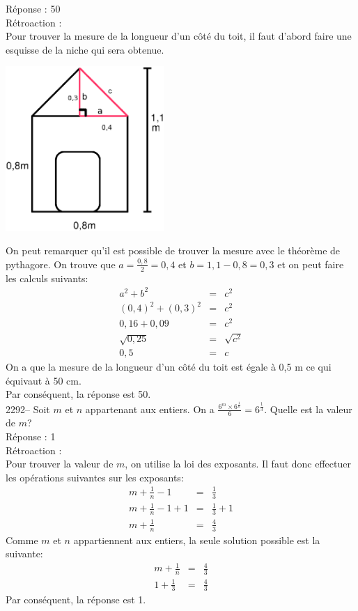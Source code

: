 \documentclass[letterpaper, 12pt]{article}
\begin{document}
R\'eponse : 50\\

R\'etroaction :\\
Pour trouver la mesure de la longueur d'un c\^ot\'e du toit, il faut d'abord faire une esquisse de la niche qui sera obtenue.\\
\begin{center}
 \includegraphics[width=6cm,bb=14 14 429 442]{Niche2291mesures.eps}
\end{center}
On peut remarquer qu'il est possible de trouver la mesure avec le th\'eor\`eme de pythagore. On trouve que $a=\frac{0,8}{2}=0,4$ et $b=1,1-0,8=0,3$ et on peut faire les calculs suivants:
\begin{eqnarray*}
a^{2}+b^{2}&=&c^{2}\\
(0,4)^{2}+(0,3)^{2}&=&c^{2}\\
0,16+0,09&=&c^{2}\\
\sqrt{0,25}&=&\sqrt{c^{2}}\\
0,5&=&c
\end{eqnarray*}
On a que la mesure de la longueur d'un c\^ot\'e du toit est \'egale \`a 0,5 m ce qui \'equivaut \`a 50 cm.\\
Par cons\'equent, la r\'eponse est 50.\\


2292-- Soit $m$ et $n$ appartenant aux entiers. On a $\frac{6^{m}\times6^{\frac{1}{n}}}{6}=6^{\frac{1}{3}}$. Quelle est la valeur de $m$?\\

R\'eponse : 1\\

R\'etroaction :\\
Pour trouver la valeur de $m$, on utilise la loi des exposants. Il faut donc effectuer les op\'erations suivantes sur les exposants:
\begin{eqnarray*}
m+\frac{1}{n}-1&=&\frac{1}{3}\\[2mm]
m+\frac{1}{n}-1+1&=&\frac{1}{3}+1\\[2mm]
m+\frac{1}{n}&=&\frac{4}{3}
\end{eqnarray*}
Comme $m$ et $n$ appartiennent aux entiers, la seule solution possible est la suivante:
\begin{eqnarray*}
m+\frac{1}{n}&=&\frac{4}{3}\\[2mm]
1+\frac{1}{3}&=&\frac{4}{3}
\end{eqnarray*}
Par cons\'equent, la r\'eponse est 1.\\
\end{document}
